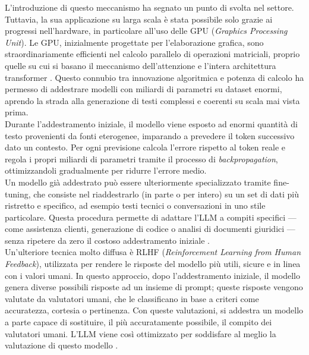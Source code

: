 L'introduzione di questo meccanismo ha segnato un punto di svolta nel settore. Tuttavia, la sua applicazione su larga scala è stata possibile solo grazie ai progressi nell'hardware, in particolare all'uso delle GPU (\textit{Graphics Processing Unit}). Le GPU, inizialmente progettate per l'elaborazione grafica, sono straordinariamente efficienti nel calcolo parallelo di operazioni matriciali, proprio quelle su cui si basano il meccanismo dell'attenzione e l'intera architettura transformer \cite{transformer_parallelizable}. Questo connubio tra innovazione algoritmica e potenza di calcolo ha permesso di addestrare modelli con miliardi di parametri su dataset enormi, aprendo la strada alla generazione di testi complessi e coerenti su scala mai vista prima. \\
Durante l'addestramento iniziale, il modello viene esposto ad enormi quantità di testo provenienti da fonti eterogenee, imparando a prevedere il token successivo dato un contesto. Per ogni previsione calcola l'errore rispetto al token reale e regola i propri miliardi di parametri tramite il processo di \textit{backpropagation}, ottimizzandoli gradualmente per ridurre l'errore medio. \\
Un modello già addestrato può essere ulteriormente specializzato tramite fine-tuning, che consiste nel riaddestrarlo (in parte o per intero) su un set di dati più ristretto e specifico, ad esempio testi tecnici o conversazioni in uno stile particolare. Questa procedura permette di adattare l'LLM a compiti specifici — come assistenza clienti, generazione di codice o analisi di documenti giuridici — senza ripetere da zero il costoso addestramento iniziale \cite{fine_tuning_transfer_learning}. \\
Un'ulteriore tecnica molto diffusa è RLHF (\textit{Reinforcement Learning from Human Feedback}), utilizzata per rendere le risposte del modello più utili, sicure e in linea con i valori umani. In questo approccio, dopo l'addestramento iniziale, il modello genera diverse possibili risposte ad un insieme di prompt; queste risposte vengono valutate da valutatori umani, che le classificano in base a criteri come accuratezza, cortesia o pertinenza. Con queste valutazioni, si addestra un modello a parte capace di sostituire, il più accuratamente possibile, il compito dei valutatori umani. L'LLM viene così ottimizzato per soddisfare al meglio la valutazione di questo modello \cite{RLHF_reward_model_from_humans}.
